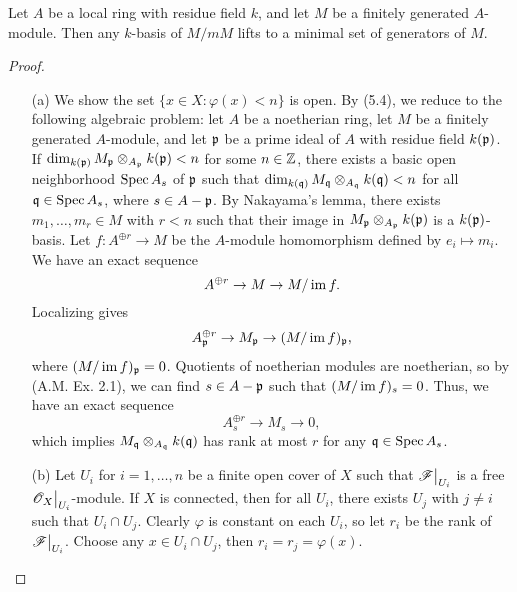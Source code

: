 \documentclass{article}
\begin{document}
\begin{enumerate} [label=\textbf{\arabic*.}, leftmargin=0em]
\begin{lemma} [Nakayama]
    Let $A$ be a local ring with residue field $k$, and let $M$ be a finitely generated $A$-module. Then any $k$-basis of $M / m M$ lifts to a minimal set of generators of $M$.
\end{lemma}

\begin{proof} $ $ \vspace{0pt}
    \begin{itemize} [leftmargin=0cm]
        \item[(a)] We show the set $\{ x \in X : \varphi(x) < n \}$ is open.  By (5.4), we reduce to the following algebraic problem: let $A$ be a noetherian ring, let $M$ be a finitely generated $A$-module, and let $\mathfrak{p}$ be a prime ideal of $A$ with residue field $k(\mathfrak{p})$. If $\dim_{k(\mathfrak{p})} M_{\mathfrak{p}} \otimes_{A_{\mathfrak{p}}} k(\mathfrak{p}) < n$ for some $n \in \mathbb{Z}$, there exists a basic open neighborhood $\operatorname{Spec}{A_s}$ of $\mathfrak{p}$ such that $\dim_{k(\mathfrak{q})} M_{\mathfrak{q}} \otimes_{A_{\mathfrak{q}}} k(\mathfrak{q}) < n$ for all $\mathfrak{q} \in \operatorname{Spec}{A_s}$, where $s \in A - \mathfrak{p}$. By Nakayama's lemma, there exists $m_1, \dots, m_r \in M$ with $r < n$ such that their image in $M_{\mathfrak{p}} \otimes_{A_{\mathfrak{p}}} k(\mathfrak{p})$ is a $k(\mathfrak{p})$-basis. Let $f : A^{\oplus r} \to M$ be the $A$-module homomorphism defined by $e_i \mapsto m_i$. We have an exact sequence
        \begin{equation*}
            A^{\oplus r} \to M \to M / \operatorname{im}{f}.
        \end{equation*}
        Localizing gives
        \begin{equation*}
            A_{\mathfrak{p}}^{\oplus r} \to M_{\mathfrak{p}} \to (M / \operatorname{im}{f})_{\mathfrak{p}},
        \end{equation*}
        where $(M / \operatorname{im}{f})_{\mathfrak{p}} = 0$. Quotients of noetherian modules are noetherian, so by (A.M. Ex. 2.1), we can find $s \in A - \mathfrak{p}$ such that $(M / \operatorname{im}{f})_s = 0$. Thus, we have an exact sequence
        \begin{equation*}
            A_s^{\oplus r} \to M_s \to 0,
        \end{equation*}
        which implies $M_{\mathfrak{q}} \otimes_{A_{\mathfrak{q}}} k(\mathfrak{q})$ has rank at most $r$ for any $\mathfrak{q} \in \operatorname{Spec}{A_s}$.

        \item[(b)] Let $U_i$ for $i = 1, \dots, n$ be a finite open cover of $X$ such that $\restr{\fF}{U_i}$ is a free $\restr{\fO_X}{U_i}$-module. If $X$ is connected, then for all $U_i$, there exists $U_j$ with $j \neq i$ such that $U_i \cap U_j$. Clearly $\varphi$ is constant on each $U_i$, so let $r_i$ be the rank of $\restr{\fF}{U_i}$. Choose any $x \in U_i \cap U_j$, then $r_i = r_j = \varphi(x)$.


\end{itemize}
\end{proof}
\end{enumerate}
\end{document}
